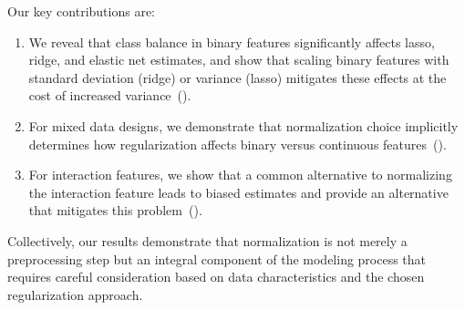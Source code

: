 Our key contributions are:
\begin{enumerate}
  \item We reveal that class balance in binary features significantly affects lasso, ridge, and
        elastic net estimates, and show that scaling binary features with standard deviation
        (ridge) or variance (lasso) mitigates these effects at the cost of increased
        variance~().
  \item For mixed data designs, we demonstrate that normalization choice implicitly determines how
        regularization affects binary versus continuous features~().
  \item For interaction features, we show that a common alternative to normalizing the interaction
        feature leads to biased estimates and provide an alternative that mitigates this
        problem~().
\end{enumerate}
Collectively, our results demonstrate that normalization is not merely a
preprocessing step but an integral component of the modeling process that
requires careful consideration based on data characteristics and the chosen
regularization approach.
